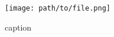 
\begin{figure}[h]
    \begin{center}
        \texttt{[image: path/to/file.png]}
        \caption{caption}
        \label{fig:A1_label}
    \end{center}
\end{figure}
